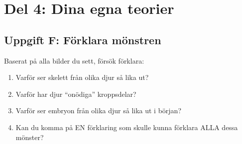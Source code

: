 \documentclass[a4paper,11pt]{article}
\begin{document}
\newpage
\section{Del 4: Dina egna teorier}

\subsection{Uppgift F: Förklara mönstren}

Baserat på alla bilder du sett, försök förklara:

\begin{enumerate}
    \item Varför ser skelett från olika djur så lika ut?
    
    \vspace{2cm}
    
    \item Varför har djur ``onödiga'' kroppsdelar?
    
    \vspace{2cm}
    
    \item Varför ser embryon från olika djur så lika ut i början?
    
    \vspace{2cm}
    
    \item Kan du komma på EN förklaring som skulle kunna förklara ALLA dessa mönster?
    
    \vspace{3cm}
\end{enumerate}
\end{document}
